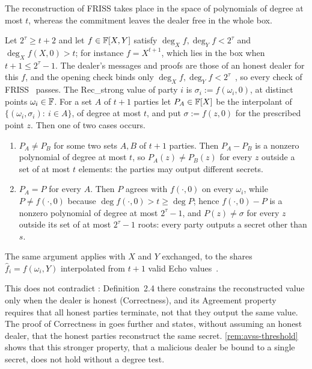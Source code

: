 The reconstruction of FRISS takes place in the space of polynomials of degree at most $t$,
whereas the commitment leaves the dealer free in the whole box.

\begin{remark}\label{rem:avss-threshold}
Let $2^\tau\ge t+2$ and let $f\in\mathbb{F}[X,Y]$ satisfy $\deg_Xf,\deg_Yf<2^\tau$ and
$\deg_Xf(X,0)>t$; for instance $f=X^{t+1}$, which lies in the box when $t+1\le2^\tau-1$. The
dealer's messages and proofs are those of an honest dealer for this $f$, and the opening check
binds only $\deg_Xf,\deg_Yf<2^\tau$~\cite[Def.~2.3, App.~B, App.~D]{PolyFRIM}, so every check
of FRISS~\cite[Alg.~2--4]{PolyFRIM} passes. The Rec\_strong value of party $i$ is
$\sigma_i:=f(\omega_i,0)$, at distinct points $\omega_i\in\mathbb{F}$. For a set $A$ of $t+1$ parties let $P_A\in\mathbb{F}[X]$ be
the interpolant of $\{(\omega_i,\sigma_i):\ i\in A\}$, of degree at most $t$, and put $\sigma:=f(z,0)$ for the
prescribed point $z$. Then one of two cases occurs.
\begin{enumerate}
\item $P_A\ne P_B$ for some two sets $A,B$ of $t+1$ parties. Then $P_A-P_B$ is a nonzero
polynomial of degree at most $t$, so $P_A(z)\ne P_B(z)$ for every $z$ outside a set of at most
$t$ elements: the parties may output different secrets.
\item $P_A=P$ for every $A$. Then $P$ agrees with $f(\cdot,0)$ on every $\omega_i$, while
$P\ne f(\cdot,0)$ because $\deg f(\cdot,0)>t\ge\deg P$; hence $f(\cdot,0)-P$ is a nonzero
polynomial of degree at most $2^\tau-1$, and $P(z)\ne\sigma$ for every $z$ outside its set of at
most $2^\tau-1$ roots: every party outputs a secret other than $s$.
\end{enumerate}
The same argument applies with $X$ and $Y$ exchanged, to the shares $\hat f_i=f(\omega_i,Y)$
interpolated from $t+1$ valid Echo values~\cite[Alg.~3, step 16]{PolyFRIM}.
\end{remark}

This does not contradict \cite[Thm.~4.1]{PolyFRIM}: Definition~2.4 there constrains the
reconstructed value only when the dealer is honest (Correctness), and its Agreement property
requires that all honest parties terminate, not that they output the same value. The proof of Correctness in \cite[App.~E]{PolyFRIM} goes further and states, without assuming an honest
dealer, that the honest parties reconstruct the same secret. \cref{rem:avss-threshold} shows
that this stronger property, that a malicious dealer be bound to a single secret, does not hold
without a degree test.

